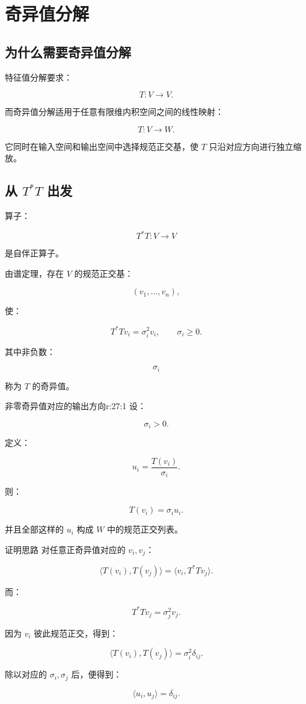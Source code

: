 
\chapter{奇异值分解}


\section{为什么需要奇异值分解}

特征值分解要求：

\[
T:V\to V.
\]

而奇异值分解适用于任意有限维内积空间之间的线性映射：

\[
T:V\to W.
\]

它同时在输入空间和输出空间中选择规范正交基，使 $T$ 只沿对应方向进行独立缩放。

\section[从 T*T 出发]{从 $T^*T$ 出发}

算子：

\[
T^*T:V\to V
\]

是自伴正算子。

由谱定理，存在 $V$ 的规范正交基：

\[
(v_1,\ldots,v_n),
\]

使：

\[
T^*Tv_i=\sigma_i^2v_i,
\qquad
\sigma_i\ge0.
\]

其中非负数：

\[
\sigma_i
\]

称为 $T$ 的奇异值。

\begin{jprop}{非零奇异值对应的输出方向}{r:27:1}
设：

\[
\sigma_i>0.
\]

定义：

\[
u_i
=
\frac{T(v_i)}{\sigma_i}.
\]

则：

\[
T(v_i)=\sigma_iu_i.
\]

并且全部这样的 $u_i$ 构成 $W$ 中的规范正交列表。
\end{jprop}

\begin{jproof}{证明思路}
对任意正奇异值对应的 $v_i,v_j$：

\[
\langle T(v_i),T(v_j)\rangle
=
\langle v_i,T^*Tv_j\rangle.
\]

而：

\[
T^*Tv_j=\sigma_j^2v_j.
\]

因为 $v_i$ 彼此规范正交，得到：

\[
\langle T(v_i),T(v_j)\rangle
=
\sigma_i^2\delta_{ij}.
\]

除以对应的 $\sigma_i,\sigma_j$ 后，便得到：

\[
\langle u_i,u_j\rangle=\delta_{ij}.
\]
\end{jproof}

